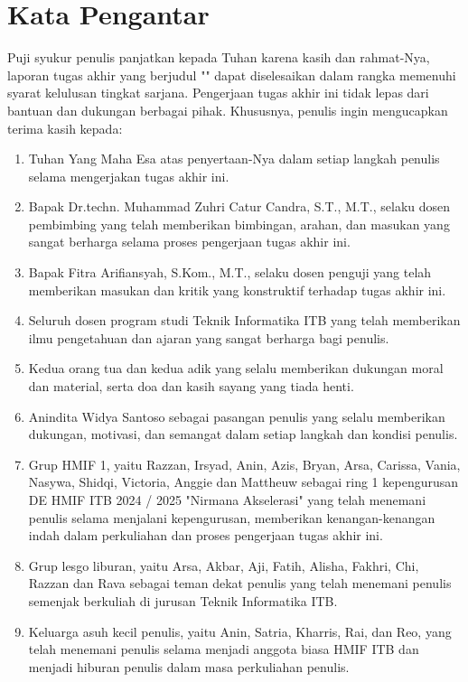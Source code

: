 \chapter*{Kata Pengantar}

Puji syukur penulis panjatkan kepada Tuhan karena kasih dan rahmat-Nya, laporan tugas akhir yang berjudul "\thetitle" dapat diselesaikan dalam rangka memenuhi syarat kelulusan tingkat sarjana. Pengerjaan tugas akhir ini tidak lepas dari bantuan dan dukungan berbagai pihak. Khususnya, penulis ingin mengucapkan terima kasih kepada:

\begin{enumerate}
	\item Tuhan Yang Maha Esa atas penyertaan-Nya dalam setiap langkah penulis selama mengerjakan tugas akhir ini.
	\item Bapak Dr.techn. Muhammad Zuhri Catur Candra, S.T., M.T., selaku dosen pembimbing yang telah memberikan bimbingan, arahan, dan masukan yang sangat berharga selama proses pengerjaan tugas akhir ini.
	\item Bapak Fitra Arifiansyah, S.Kom., M.T., selaku dosen penguji yang telah memberikan masukan dan kritik yang konstruktif terhadap tugas akhir ini.
	\item Seluruh dosen program studi Teknik Informatika ITB yang telah memberikan ilmu pengetahuan dan ajaran yang sangat berharga bagi penulis.
	\item Kedua orang tua dan kedua adik yang selalu memberikan dukungan moral dan material, serta doa dan kasih sayang yang tiada henti.
	\item Anindita Widya Santoso sebagai pasangan penulis yang selalu memberikan dukungan, motivasi, dan semangat dalam setiap langkah dan kondisi penulis.
	\item Grup HMIF 1, yaitu Razzan, Irsyad, Anin, Azis, Bryan, Arsa, Carissa, Vania, Nasywa, Shidqi, Victoria, Anggie dan Mattheuw sebagai ring 1 kepengurusan DE HMIF ITB 2024 / 2025 "Nirmana Akselerasi" yang telah menemani penulis selama menjalani kepengurusan, memberikan kenangan-kenangan indah dalam perkuliahan dan proses pengerjaan tugas akhir ini.
	\item Grup lesgo liburan, yaitu Arsa, Akbar, Aji, Fatih, Alisha, Fakhri, Chi, Razzan dan Rava sebagai teman dekat penulis yang telah menemani penulis semenjak berkuliah di jurusan Teknik Informatika ITB.
	\item Keluarga asuh kecil penulis, yaitu Anin, Satria, Kharris, Rai, dan Reo, yang telah menemani penulis selama menjadi anggota biasa HMIF ITB dan menjadi hiburan penulis dalam masa perkuliahan penulis.

\end{enumerate}
